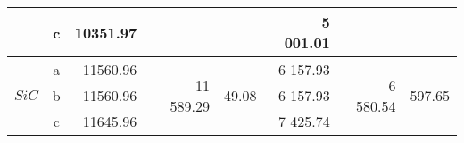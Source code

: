 \begin{table}[H]
{\begin{tabular}{|c|c|r|r|r|r|r|r|}
                                                                                                     & c        & 10351.97                                                                      &                                                                                     &                                                                                       & 5 001.01                                                                      &                                                                                     &                                                                                       \\ \hline
    \multirow{3}{*}{$SiC$}                                                                           & a        & 11560.96                                                                      & \multirow{3}{*}{11 589.29}                                                          & \multirow{3}{*}{49.08}                                                                & 6 157.93                                                                      & \multirow{3}{*}{6 580.54}                                                           & \multirow{3}{*}{597.65}                                                               \\ \cline{2-3} \cline{6-6}
                                                                                                     & b        & 11560.96                                                                      &                                                                                     &                                                                                       & 6 157.93                                                                      &                                                                                     &                                                                                       \\ \cline{2-3} \cline{6-6}
                                                                                                     & c        & 11645.96                                                                      &                                                                                     &                                                                                       & 7 425.74                                                                      &                                                                                     &                                                                                       \\ \hline

\end{tabular}}
\end{table}
